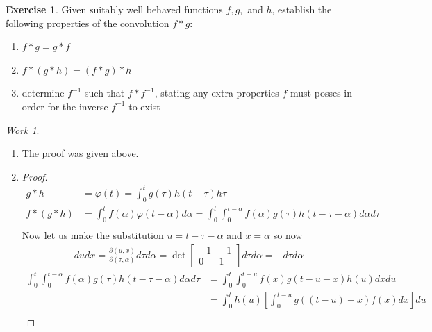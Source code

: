 \documentclass{report}
\theoremstyle{definition}
\newtheorem{exercise}{Exercise}[chapter]
\theoremstyle{remark}
\newtheorem*{work}{Work}
\begin{document}
\begin{exercise}
    Given suitably well behaved functions $f,g,$ and $h$, establish the following properties of the convolution $f*g$:
    \begin{enumerate}[label=(\alph*)]
        \item $f*g=g*f$
        \item $f*(g*h)=(f*g)*h$
        \item determine $f^{-1}$ such that $f*f^{-1}$, stating any extra properties $f$ must posses in order for the inverse $f^{-1}$ to exist
    \end{enumerate}
\end{exercise}
\begin{work}
\leavevmode
    \begin{enumerate}[label=(\alph*)]
        \item The proof was given above.
        \item \begin{proof}\begin{equation*}
            \begin{split}
                g*h &= \varphi(t) = \int^t_0g(\tau)h(t-\tau)h\tau \\
                f*(g*h)&= \int^t_0f(\alpha)\varphi(t-\alpha)d\alpha =\int^t_0\int^{t-\alpha}_0f(\alpha)g(\tau)h(t-\tau-\alpha)d\alpha d\tau \\
            \end{split}
        \end{equation*}
        Now let us make the substitution $u=t-\tau-\alpha$ and $x=\alpha$ so now 
        \begin{equation*}
        \begin{split}
            dudx = \frac{\partial (u,x)}{\partial(\tau,\alpha)}d\tau d\alpha = \det \left[\begin{matrix}
                -1&-1\\0&1
            \end{matrix} \right] d\tau d\alpha= -d\tau d\alpha
            \end{split}
        \end{equation*}
        \begin{equation*}
            \begin{split}
                \int^t_0\int^{t-\alpha}_0f(\alpha)g(\tau)h(t-\tau-\alpha)d\alpha d\tau &=\int^t_0\int^{t-u}_0f(x)g(t-u-x)h(u)dxdu \\
                &=\int^t_0 h(u)\left[ \int^{t-u}_0g((t-u)-x)f(x)dx\right]du\\

\end{split}
\end{equation*}
\end{proof}
\end{enumerate}
\end{work}
\end{document}
